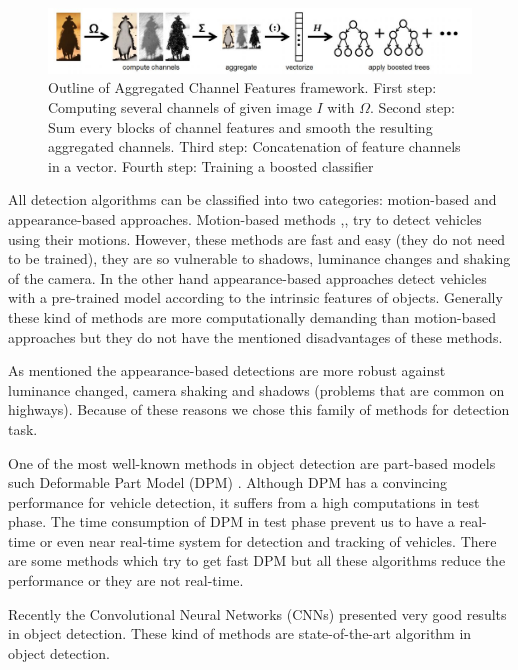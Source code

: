 \documentclass[conference]{IEEEtran}
\begin{document}
\begin{figure}
	\centering
	\includegraphics[width=\textwidth]{images/acfSteps.JPG}
	\caption{Outline of Aggregated Channel Features framework. First step: Computing several channels of given image $I$ with $\Omega$. Second step: Sum every blocks of channel features and smooth the resulting aggregated channels. Third step: Concatenation of feature channels in a vector. Fourth step: Training a boosted classifier \cite{dollar2014fast}}
	\label{ACFSteps}
\end{figure}



All detection algorithms can be classified into two categories: motion-based and appearance-based approaches. Motion-based methods \cite{sen2004robust},\cite{sirikuntamat2015vehicle},\cite{lu2014moving} try to detect vehicles using their motions. However, these methods are fast and easy (they do not need to be trained), they are so vulnerable to shadows, luminance changes and shaking of the camera. In the other hand appearance-based approaches detect vehicles with a pre-trained model according to the intrinsic features of objects. Generally these kind of methods are more  computationally demanding than motion-based approaches but they do not have the mentioned disadvantages of these methods.

As mentioned the appearance-based detections are more robust against luminance changed, camera shaking and shadows (problems that are common on highways). Because of these reasons we chose this family of methods for detection task. 

One of the most well-known methods in object detection are part-based models such Deformable Part Model (DPM) \cite{felzenszwalb2008discriminatively}. Although DPM has a convincing performance for vehicle detection, it suffers from a high computations in test phase. The time consumption of DPM in test phase prevent us to have a real-time or even near real-time system for detection and tracking of vehicles. There are some methods which try to get fast DPM \cite{} but all these algorithms reduce the performance or they are not real-time.

Recently the Convolutional Neural Networks (CNNs) presented very good results in object detection. These kind of methods are state-of-the-art algorithm in object detection.
\end{document}
